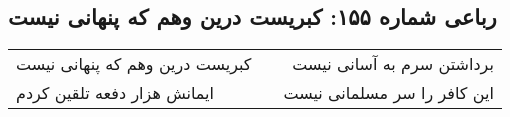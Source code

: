 \begin{center}
\section*{رباعی شماره ۱۵۵: کبریست درین وهم که پنهانی نیست}
\label{sec:sh155}
\begin{longtable}{l p{0.5cm} r}
کبریست درین وهم که پنهانی نیست
&&
برداشتن سرم به آسانی نیست
\\
ایمانش هزار دفعه تلقین کردم
&&
این کافر را سر مسلمانی نیست
\\
\end{longtable}
\end{center}
